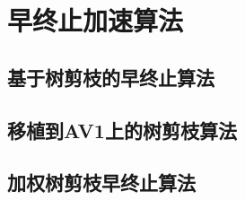 \chapter{早终止加速算法}
\label{cha:early-termination}

\section{基于树剪枝的早终止算法}

\section{移植到AV1上的树剪枝算法}

\section{加权树剪枝早终止算法}